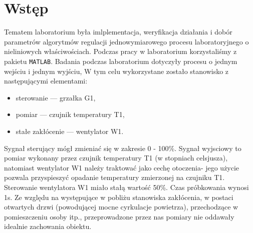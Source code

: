 \chapter{Wstęp}
Tematem laboratorium była imlplementacja, weryfikacja działania i dobór parametrów algorytmów
regulacji jednowymiarowego procesu laboratoryjnego o nieliniowych właściwościach.
Podczas pracy w laboratorium korzystaliśmy z pakietu \texttt{MATLAB}.
Badania podczas laboratorium dotyczyły procesu o jednym wejściu i jednym wyjściu, W tym celu wykorzystane
zostało stanowisko z następującymi elementami:
\begin{itemize}
  \item sterowanie --- grzałka G1,
  \item pomiar --- czujnik temperatury T1,
  \item stałe zakłócenie --- wentylator W1.
\end{itemize}
Sygnał sterujący mógł zmieniać się w zakresie 0 - 100\%.
Sygnał wyjsciowy to pomiar wykonany przez czujnik temperatury T1 (w stopniach celsjusza),
natomiast wentylator W1 należy traktować jako cechę otoczenia- jego użycie pozwala przyspieszyć opadanie
temperatury zmierzonej na czujniku T1. Sterowanie wentylatora W1 miało stałą wartość 50\%.
Czas próbkowania wynosi 1s. Ze względu na występujące w pobliżu stanowiska zakłócenia,
w postaci otwartych drzwi (powodującej mocne cyrkulacje powietrza),
przechodzące w pomieszczeniu osoby itp., przeprowadzone przez nas pomiary nie oddawały
idealnie zachowania obiektu.
